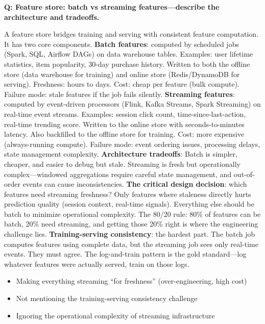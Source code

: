 \begin{interviewq}
\end{interviewq}

\begin{interviewq}
\textbf{Q: Feature store: batch vs streaming features---describe the architecture and tradeoffs.}

 \quad {} \quad \badgefreq{\freqmed}

\stronganswer A feature store bridges training and serving with consistent feature computation. It has two core components. \textbf{Batch features}: computed by scheduled jobs (Spark, SQL, Airflow DAGs) on data warehouse tables. Examples: user lifetime statistics, item popularity, 30-day purchase history. Written to both the offline store (data warehouse for training) and online store (Redis/DynamoDB for serving). Freshness: hours to days. Cost: cheap per feature (bulk compute). Failure mode: stale features if the job fails silently. \textbf{Streaming features}: computed by event-driven processors (Flink, Kafka Streams, Spark Streaming) on real-time event streams. Examples: session click count, time-since-last-action, real-time trending score. Written to the online store with seconds-to-minutes latency. Also backfilled to the offline store for training. Cost: more expensive (always-running compute). Failure mode: event ordering issues, processing delays, state management complexity. \textbf{Architecture tradeoffs}: Batch is simpler, cheaper, and easier to debug but stale. Streaming is fresh but operationally complex---windowed aggregations require careful state management, and out-of-order events can cause inconsistencies. \textbf{The critical design decision}: which features need streaming freshness? Only features where staleness directly hurts prediction quality (session context, real-time signals). Everything else should be batch to minimize operational complexity. The 80/20 rule: 80\% of features can be batch, 20\% need streaming, and getting those 20\% right is where the engineering challenge lies. \textbf{Training-serving consistency}: the hardest part. The batch job computes features using complete data, but the streaming job sees only real-time events. They must agree. The log-and-train pattern is the gold standard---log whatever features were actually served, train on those logs.

\redflags
\begin{itemize}
    \item Making everything streaming ``for freshness'' (over-engineering, high cost)
    \item Not mentioning the training-serving consistency challenge
    \item Ignoring the operational complexity of streaming infrastructure
\end{itemize}


\end{interviewq}
